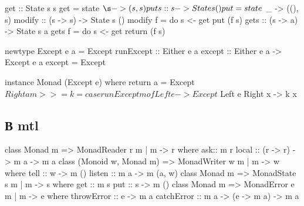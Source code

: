 \documentclass[11pt,a4paper]{article}
\begin{document}
\hfill
\begin{minipage}{0.42\textwidth}
\begin{hscode}
get :: State s s
get = state $ \s -> (s, s)
put s :: s -> State s ()
put = state $ \_ -> ((), s)
modify :: (s -> s) -> State s ()
modify f = do s <- get
              put (f s)
gets :: (s -> a) -> State s a 
gets f = do s <- get
         return (f s) 
\end{hscode}
\end{minipage}
\begin{minipage}{0.55\textwidth}
\begin{hscode}
newtype Except e a = Except {runExcept :: Either e a}
except :: Either e a -> Except e a
except = Except

instance Monad (Except e) where
	return a = Except $ Right a
	m >>= k = case runExcept m of
		Left e -> Except $ Left e
		Right x -> k x
\end{hscode}
\end{minipage}
\hfill
\begin{minipage}{0.42\textwidth}
\end{minipage}
\subsection{В mtl}
\begin{hscode}
class Monad m => MonadReader r m | m -> r where
	ask:: m r
	local :: (r -> r) -> m a -> m a
class (Monoid w, Monad m) => MonadWriter w m | m -> w where
	tell :: w -> m ()
	listen :: m a -> m (a, w)
class Monad m => MonadState s m | m -> s where
	get :: m s
	put :: s -> m ()
class Monad m => MonadError e m | m -> e where
	throwError :: e -> m a
	catchError :: m a -> (e -> m a) -> m a
\end{hscode}
\end{document}
